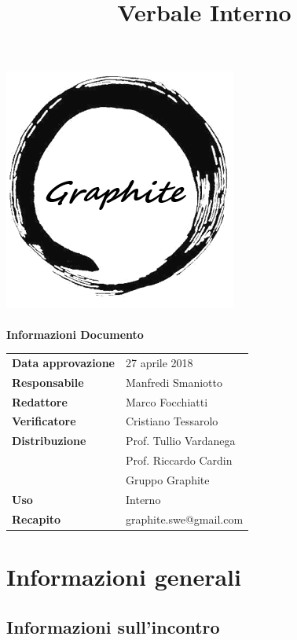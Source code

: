 \documentclass[openany,12pt,a4paper]{article}
\title{Verbale Interno}
\author{}
\begin{document}
	\makeatletter
	\begin{titlepage}
		\setlength{\headsep}{0pt}  
		\begin{center}
			\includegraphics[width=0.5\linewidth]{Logo.png}\\[1em]
			{\huge \bfseries  \@title }\\[10ex]
			\textbf{\Large Informazioni Documento} \\[2em]
			\bgroup
			\def\arraystretch{1.5}
			\begin{tabular}{l|l}
				\textbf{Data approvazione} & 27 aprile 2018 \\
				\textbf{Responsabile} & Manfredi Smaniotto \\
				\textbf{Redattore} & Marco Focchiatti \\
				\textbf{Verificatore} & Cristiano Tessarolo \\
				\textbf{Distribuzione} & Prof. Tullio Vardanega \\
				 & Prof. Riccardo Cardin \\
				 & Gruppo Graphite \\
				\textbf{Uso} & Interno \\
				\textbf{Recapito} & graphite.swe@gmail.com \\
			\end{tabular}
		\egroup
		\end{center}
	\end{titlepage}
	\makeatother

	\thispagestyle{empty}
	\newpage
	
	\tableofcontents
	\newpage
	
	\section{Informazioni generali}
	
	\subsection{Informazioni sull'incontro}
	
\end{document}
